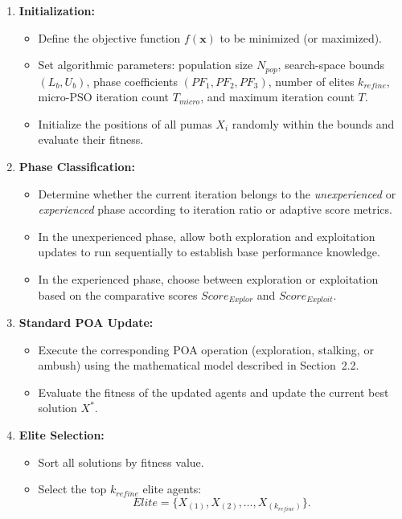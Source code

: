 \documentclass[a4paper,12pt]{article}
\begin{document}
\begin{enumerate}
    \item \textbf{Initialization:} 
    \begin{itemize}
        \item Define the objective function $f(\mathbf{x})$ to be minimized (or maximized).
        \item Set algorithmic parameters: population size $N_{pop}$, search-space bounds $(L_b, U_b)$, phase coefficients $(PF_1, PF_2, PF_3)$, number of elites $k_{refine}$, micro-PSO iteration count $T_{micro}$, and maximum iteration count $T$.
        \item Initialize the positions of all pumas $X_i$ randomly within the bounds and evaluate their fitness.
    \end{itemize}

    \item \textbf{Phase Classification:}
    \begin{itemize}
        \item Determine whether the current iteration belongs to the \textit{unexperienced} or \textit{experienced} phase according to iteration ratio or adaptive score metrics.
        \item In the unexperienced phase, allow both exploration and exploitation updates to run sequentially to establish base performance knowledge.
        \item In the experienced phase, choose between exploration or exploitation based on the comparative scores $Score_{Explor}$ and $Score_{Exploit}$.
    \end{itemize}

    \item \textbf{Standard POA Update:}
    \begin{itemize}
        \item Execute the corresponding POA operation (exploration, stalking, or ambush) using the mathematical model described in Section~2.2.
        \item Evaluate the fitness of the updated agents and update the current best solution $X^*$.
    \end{itemize}

    \item \textbf{Elite Selection:}
    \begin{itemize}
        \item Sort all solutions by fitness value.
        \item Select the top $k_{refine}$ elite agents:
        \[
        Elite = \{ X_{(1)}, X_{(2)}, \ldots, X_{(k_{refine})} \}.
        \]
    \end{itemize}


\end{enumerate}
\end{document}

